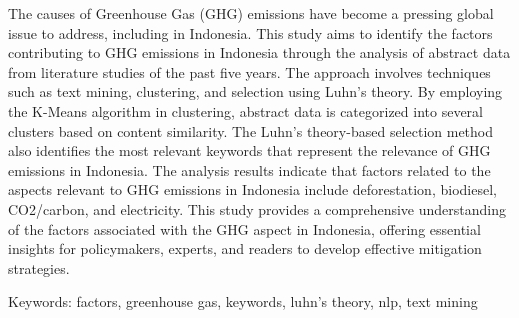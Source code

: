 The causes of Greenhouse Gas (GHG) emissions have become a pressing global issue to address, including in Indonesia. This study aims to identify the factors contributing to GHG emissions in Indonesia through the analysis of abstract data from literature studies of the past five years. The approach involves techniques such as text mining, clustering, and selection using Luhn's theory. By employing the K-Means algorithm in clustering, abstract data is categorized into several clusters based on content similarity. The Luhn's theory-based selection method also identifies the most relevant keywords that represent the relevance of GHG emissions in Indonesia. The analysis results indicate that factors related to the aspects relevant to GHG emissions in Indonesia include deforestation, biodiesel, CO2/carbon, and electricity. This study provides a comprehensive understanding of the factors associated with the GHG aspect in Indonesia, offering essential insights for policymakers, experts, and readers to develop effective mitigation strategies.

Keywords: factors, greenhouse gas, keywords, luhn's theory, nlp, text mining